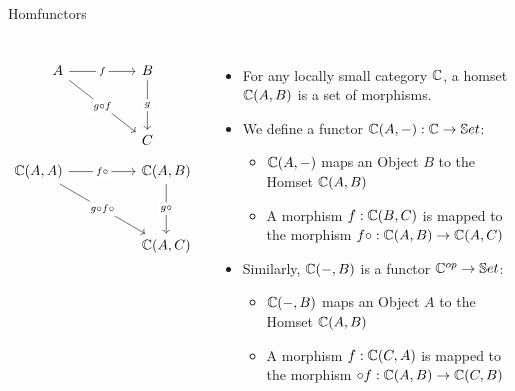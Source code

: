 \begin{frame}[fragile]{Homfunctors}
	\begin{columns}
		\[\begin{tikzcd}
			A && B \\
			\\
			&& C
			\arrow["f"{description}, from=1-1, to=1-3]
			\arrow["{g \circ f}"{description}, from=1-1, to=3-3]
			\arrow["g"{description}, from=1-3, to=3-3]
		\end{tikzcd}\]
		\[\begin{tikzcd}
			{\bC(A,A)} && {\bC(A,B)}\\
			\\
			&& {\bC(A,C)}
			\arrow["{f \circ}"{description}, from=1-1, to=1-3]
			\arrow["{g \circ f \circ}"{description}, from=1-1, to=3-3]
			\arrow["{g \circ}"{description}, from=1-3, to=3-3]
		\end{tikzcd}\]
		\begin{itemize}
			\item For any locally small category $\mathbb{C}$, a homset $\mathbb{C}(A,B)$ is a set of morphisms.
			\pause\item We define a functor $\mathbb{C}(A, -) : \mathbb{C} \to \mathbb{S}et$:
			\begin{itemize}
				\pause\item $\mathbb{C}(A, -)$ maps an Object $B$ to the Homset $\mathbb{C}(A,B)$
				\pause\item A morphism $f : \mathbb{C}(B,C)$ is mapped to the morphism $f \circ : \mathbb{C}(A,B) \to \mathbb{C}(A,C)$
			\end{itemize}
			\pause\item Similarly, $\mathbb{C}(-, B)$ is a functor $\mathbb{C}^{op} \to \mathbb{S}et$:
			\begin{itemize}
				\pause\item $\mathbb{C}(-, B)$ maps an Object $A$ to the Homset $\mathbb{C}(A,B)$
				\pause\item A morphism $f : \mathbb{C}(C,A)$ is mapped to the morphism $\circ f: \mathbb{C}(A,B) \to \mathbb{C}(C,B)$
			\end{itemize}
		\end{itemize}
	\end{columns}
\end{frame}

